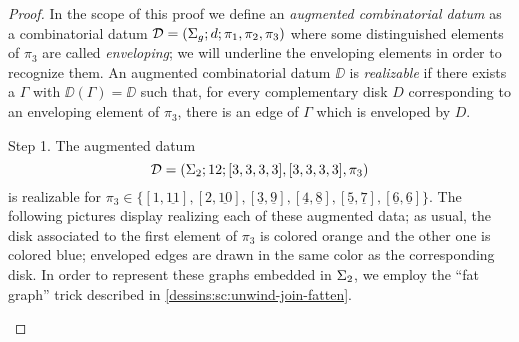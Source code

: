 \begin{proof}
\def\env#1{\underline{#1}}
In the scope of this proof we define an \emph{augmented combinatorial datum} as a combinatorial datum $\mathcal{D}=(\Sigma_{g};d;\pi_1,\pi_2,\pi_3)$ where some distinguished elements of $\pi_3$ are called \emph{enveloping}; we will underline the enveloping elements in order to recognize them. An augmented combinatorial datum $\DD$ is \emph{realizable} if there exists a \dessin{} $\Gamma$ with $\DD(\Gamma)=\DD$ such that, for every complementary disk $D$ corresponding to an enveloping element of $\pi_3$, there is an edge of $\Gamma$ which is enveloped by $D$.
\begin{sideline}{Step 1.}
The augmented datum
\[
\mathcal{D}=(\Sigma_{2};12;[3,3,3,3],[3,3,3,3],\pi_3)
\]
is realizable for $\pi_3\in\{[1,\env{11}],[2,\env{10}],[\env{3},\env{9}],[\env{4},\env{8}],[\env{5},\env{7}],[\env{6},\env{6}]\}$. The following pictures display \dessins{} realizing each of these augmented data; as usual, the disk associated to the first element of $\pi_3$ is colored orange and the other one is colored blue; enveloped edges are drawn in the same color as the corresponding disk. In order to represent these graphs embedded in $\Sigma_{2}$, we employ the ``fat graph'' trick described in \cref{dessins:sc:unwind-join-fatten}.

\bgroup

\smallvertices{}
\def\myradius{1.33}
\def\draweightvertices{
\path[use as bounding box] (-1.8,-1.5) rectangle (1.8,2);
\path (0:\myradius) coordinate (w1) pic{white vertex};
\path (90:\myradius) coordinate (w2) pic{white vertex};
\path (180:\myradius) coordinate (w3) pic{white vertex};
\path (270:\myradius) coordinate (w4) pic{white vertex};
\path (45:\myradius) coordinate (b1) pic{black vertex};
\path (135:\myradius) coordinate (b2) pic{black vertex};
\path (225:\myradius) coordinate (b3) pic{black vertex};
\path (315:\myradius) coordinate (b4) pic{black vertex};
}


\end{sideline}
\end{proof}
